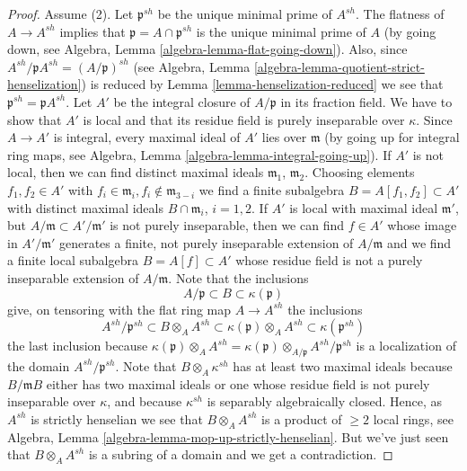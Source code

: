 \begin{proof}
\medskip\noindent
Assume (2). Let $\mathfrak p^{sh}$ be the unique minimal prime of
$A^{sh}$. The flatness of $A \to A^{sh}$ implies that
$\mathfrak p = A \cap \mathfrak p^{sh}$ is the unique minimal
prime of $A$ (by going down, see
Algebra, Lemma \ref{algebra-lemma-flat-going-down}).
Also, since $A^{sh}/\mathfrak pA^{sh} = (A/\mathfrak p)^{sh}$ (see
Algebra, Lemma \ref{algebra-lemma-quotient-strict-henselization})
is reduced by Lemma \ref{lemma-henselization-reduced}
we see that $\mathfrak p^{sh} = \mathfrak pA^{sh}$.
Let $A'$ be the integral closure of $A/\mathfrak p$ in its fraction
field. We have to show that $A'$ is local and that its residue
field is purely inseparable over $\kappa$.
Since $A \to A'$ is integral, every maximal ideal of $A'$ lies over
$\mathfrak m$ (by going up for integral ring maps, see
Algebra, Lemma \ref{algebra-lemma-integral-going-up}).
If $A'$ is not local, then we can find distinct maximal ideals
$\mathfrak m_1$, $\mathfrak m_2$. Choosing elements $f_1, f_2 \in A'$
with $f_i \in \mathfrak m_i, f_i \not \in \mathfrak m_{3 - i}$ we find
a finite subalgebra $B = A[f_1, f_2] \subset A'$ with distinct maximal
ideals $B \cap \mathfrak m_i$, $i = 1, 2$. If $A'$ is local with maximal
ideal $\mathfrak m'$, but $A/\mathfrak m \subset A'/\mathfrak m'$
is not purely inseparable, then we can find $f \in A'$ whose image in
$A'/\mathfrak m'$ generates a finite, not purely inseparable extension
of $A/\mathfrak m$ and we find a finite local subalgebra $B = A[f] \subset A'$
whose residue field is not a purely inseparable extension of $A/\mathfrak m$.
Note that the inclusions
$$
A/\mathfrak p \subset B \subset \kappa(\mathfrak p)
$$
give, on tensoring with the flat ring map $A \to A^{sh}$ the inclusions
$$
A^{sh}/\mathfrak p^{sh} \subset
B \otimes_A A^{sh} \subset
\kappa(\mathfrak p) \otimes_A A^{sh} \subset
\kappa(\mathfrak p^{sh})
$$
the last inclusion because
$\kappa(\mathfrak p) \otimes_A A^{sh} =
\kappa(\mathfrak p) \otimes_{A/\mathfrak p} A^{sh}/\mathfrak p^{sh}$
is a localization of the domain $A^{sh}/\mathfrak p^{sh}$.
Note that $B \otimes_A \kappa^{sh}$ has at least two maximal ideals
because $B/\mathfrak mB$ either has two maximal ideals or one whose
residue field is not purely inseparable over $\kappa$, and because
$\kappa^{sh}$ is separably algebraically closed. Hence, as
$A^{sh}$ is strictly henselian we see that
$B \otimes_A A^{sh}$ is a product of $\geq 2$ local rings, see
Algebra, Lemma \ref{algebra-lemma-mop-up-strictly-henselian}.
But we've just seen that $B \otimes_A A^{sh}$ is a subring of a domain
and we get a contradiction.


\end{proof}
